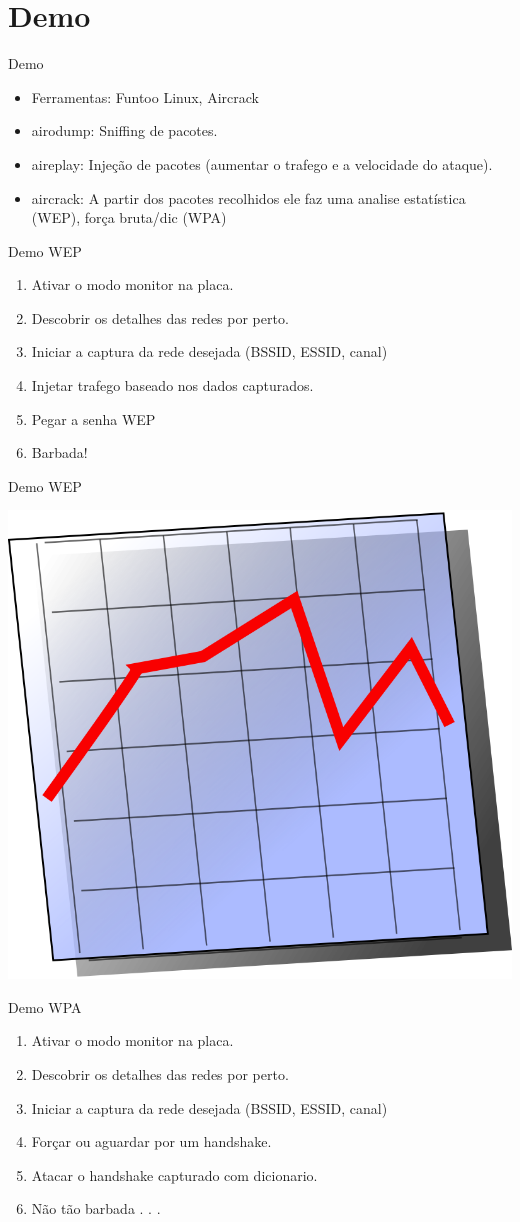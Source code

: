 \documentclass[xcolor=x11names,compress]{beamer}
\renewcommand{\(}{\begin{columns}}
\renewcommand{\)}{\end{columns}}
\newcommand{\<}[1]{\begin{column}{#1}}
\renewcommand{\>}{\end{column}}
\begin{document}
\section{Demo}
\begin{frame}{Demo}
\begin{itemize}
\item Ferramentas: Funtoo Linux, Aircrack
\item airodump: Sniffing de pacotes.
\item aireplay: Injeção de pacotes (aumentar o trafego e a velocidade do ataque).
\item aircrack: A partir dos pacotes recolhidos ele faz uma analise estatística (WEP), força bruta/dic (WPA)
\end{itemize}
\end{frame}

\begin{frame}{Demo WEP}
\begin{enumerate}
\item Ativar o modo monitor na placa.
\item Descobrir os detalhes das redes por perto.
\item Iniciar a captura da rede desejada (BSSID, ESSID, canal)
\item Injetar trafego baseado nos dados capturados.
\item Pegar a senha WEP
\pause
\item Barbada!
\end{enumerate}
\end{frame}


\begin{frame}{Demo WEP}
\begin{center}
\includegraphics[width=0.5\linewidth]{./Pictures/wep}
\end{center}
\end{frame}

\begin{frame}{Demo WPA}
\begin{enumerate}
\item Ativar o modo monitor na placa.
\item Descobrir os detalhes das redes por perto.
\item Iniciar a captura da rede desejada (BSSID, ESSID, canal)
\item Forçar ou aguardar por um handshake.
\item Atacar o handshake capturado com dicionario.
\pause
\item Não tão barbada . . .
\end{enumerate}
\end{frame}
\end{document}
